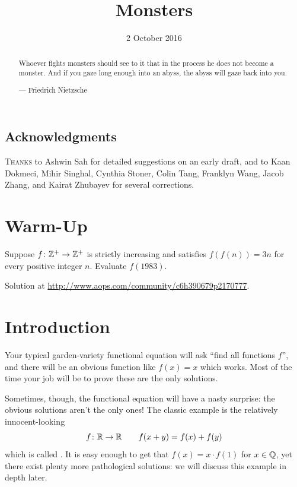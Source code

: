 \documentclass[11pt]{scrartcl}
\begin{document}
\title{Monsters}
\date{2 October 2016}
\maketitle
\begin{abstract}
  \sffamily\small
  Whoever fights monsters should see to it that in the process
  he does not become a monster.
  And if you gaze long enough into an abyss,
  the abyss will gaze back into you.

  \medskip

  --- Friedrich Nietzsche
\end{abstract}

\subsection*{Acknowledgments}
\textsc{Thanks} to Ashwin Sah for detailed suggestions on an early draft,
and to Kaan Dokmeci, Mihir Singhal, Cynthia Stoner, Colin Tang, Franklyn Wang,
Jacob Zhang, and Kairat Zhubayev for several corrections.

\section{Warm-Up}
\begin{problem}
  Suppose $f \colon \mathbb Z^+ \to \mathbb Z^+$ is strictly increasing and
  satisfies $f(f(n)) = 3n$ for every positive integer $n$.
  Evaluate $f(1983)$.
\end{problem}
\noindent Solution at \url{http://www.aops.com/community/c6h390679p2170777}.

\section{Introduction}
Your typical garden-variety functional equation will ask ``find all functions $f$'',
and there will be an obvious function like $f(x) = x$ which works.
Most of the time your job will be to prove these are the only solutions.

Sometimes, though, the functional equation will have a nasty surprise: the obvious solutions
aren't the only ones! The classic example is the relatively
innocent-looking \[ f \colon \mathbb R \to \mathbb R \qquad f(x+y) = f(x)+f(y) \]
which is called .
It is easy enough to get that $f(x) = x \cdot f(1)$ for $x \in \mathbb Q$,
yet there exist plenty more pathological solutions:
we will discuss this example in depth later.
\end{document}
